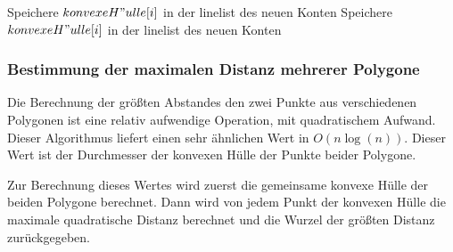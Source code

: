 \begin{algorithm}[!ht]
{{        	
{
			Speichere $konvexeH"ulle[i]$ in der linelist des neuen Konten\;
}
{
			Speichere $konvexeH"ulle[i]$ in der linelist des neuen Konten\;
}
}
%         
{
%             
}
}
 \end{algorithm}

\clearpage
\subsubsection{Bestimmung der maximalen Distanz mehrerer Polygone}\label{maxDist}
\label{gmD}
Die Berechnung der größten Abstandes den zwei Punkte aus verschiedenen Polygonen ist eine relativ aufwendige Operation, mit quadratischem Aufwand. Dieser Algorithmus liefert einen sehr ähnlichen Wert in $O(n\log(n))$. Dieser Wert ist der Durchmesser der konvexen Hülle der Punkte beider Polygone. 

Zur Berechnung dieses Wertes wird zuerst die gemeinsame konvexe Hülle der beiden Polygone berechnet. Dann wird von jedem Punkt der konvexen Hülle die maximale quadratische Distanz berechnet und die Wurzel der größten Distanz zurückgegeben.

